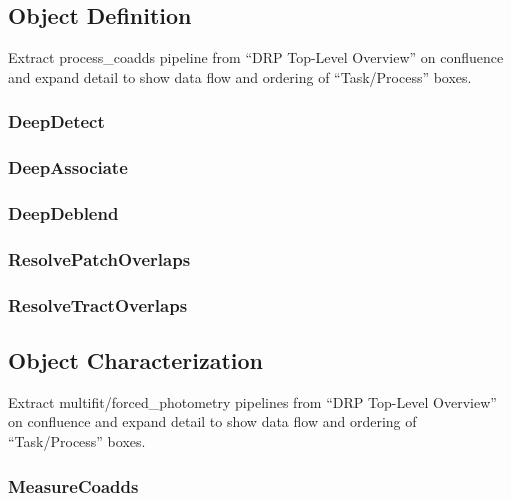 \subsection{Object Definition}
\label{sec:drp_object_definition}

\begin{note}
Extract process\_coadds pipeline from ``DRP Top-Level Overview'' on confluence and expand detail to show data flow and ordering of ``Task/Process'' boxes.
\end{note}

\subsubsection{DeepDetect}
\label{sec:drpDeepDetect}
\subsubsection{DeepAssociate}
\label{sec:drpDeepAssociate}
\subsubsection{DeepDeblend}
\label{sec:drpDeepDeblend}
\subsubsection{ResolvePatchOverlaps}
\label{sec:drpResolvePatchOverlaps}
\subsubsection{ResolveTractOverlaps}
\label{sec:drpResolveTractOverlaps}

\subsection{Object Characterization}
\label{sec:drp_object_characterization}

\begin{note}
Extract multifit/forced\_photometry pipelines from ``DRP Top-Level Overview'' on confluence and expand detail to show data flow and ordering of ``Task/Process'' boxes.
\end{note}

\subsubsection{MeasureCoadds}
\label{sec:drpMeasureCoadds}
